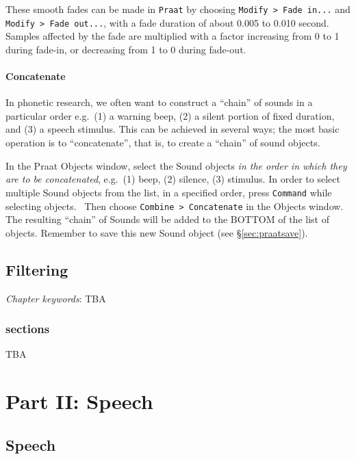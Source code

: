 \documentclass[
]{book}
\begin{document}
\label{box-praatfades}
These smooth fades can be made in \texttt{Praat} by choosing \texttt{Modify\ \textgreater{}\ Fade\ in...} and \texttt{Modify\ \textgreater{}\ Fade\ out...}, with a fade duration of about 0.005 to 0.010 second. Samples affected by the fade are multiplied with a factor increasing from 0 to 1 during fade-in, or decreasing from 1 to 0 during fade-out.

\subsection{Concatenate}\label{sec:concatenate}

In phonetic research, we often want to construct a ``chain'' of sounds in a particular order e.g.~(1) a warning beep, (2) a silent portion of fixed duration, and (3) a speech stimulus. This can be achieved in several ways; the most basic operation is to ``concatenate'', that is, to create a ``chain'' of sound objects.

\label{box-praatconcatenate}
In the Praat Objects window, select the Sound objects \emph{in the order in which they are to be concatenated}, e.g.~(1) beep, (2) silence, (3) stimulus. In order to select multiple Sound objects from the list, in a specified order, press \texttt{Command} while selecting objects.~
Then choose \texttt{Combine\ \textgreater{}\ Concatenate} in the Objects window. The resulting ``chain'' of Sounds will be added to the BOTTOM of the list of objects. Remember to save this new Sound object (see §\ref{sec:praatsave}).

\chapter{Filtering}\label{ch-filtering}

\emph{Chapter keywords}: TBA

\section{sections}\label{sections}

TBA

\part*{Part II: Speech}\label{part-part-ii-speech}

\chapter{Speech}\label{ch-speech}
\end{document}
